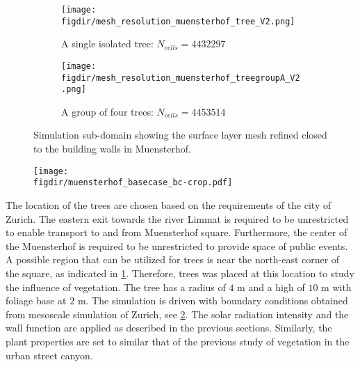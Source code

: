 \begin{figure}[p]
	\centering
	\begin{subfigure}[b]{0.8\linewidth}
		\texttt{[image: \\figdir/mesh\_resolution\_muensterhof\_tree\_V2.png]}
		\caption{A single isolated tree: $N_{\textit{cells}} = \num{4432297}$}%
	\end{subfigure}
	
	\medskip
	
	\begin{subfigure}[b]{0.8\linewidth}
		\texttt{[image: \\figdir/mesh\_resolution\_muensterhof\_treegroupA\_V2.png]}
		\caption{A group of four trees: $N_{\textit{cells}} = \num{4453514}$}%
	\end{subfigure}
	\caption{Simulation sub-domain showing the surface layer mesh refined closed to the building walls in Muensterhof.}
	\label{fig:mesh_resolution_muensterhof_tree}
\end{figure}

\begin{figure}[p]
	\centering
	\texttt{[image: \\figdir/muensterhof\_basecase\_bc-crop.pdf]}
	\caption{}
	\label{fig:muensterhof_bc}
\end{figure}


The location of the trees are chosen based on the requirements of the city of Zurich. The eastern exit towards the river Limmat is required to be unrestricted to enable transport to and from Muensterhof square. Furthermore, the center of the Muensterhof is required to be unrestricted to provide space of public events. A possible region that can be utilized for trees is near the north-east corner of the square, as indicated in \cref{fig:mesh_resolution_muensterhof_tree}. Therefore, trees was placed at this location to study the influence of vegetation. The tree has a radius of $4$ m and a high of $10$ m with foliage base at $2$ m. The simulation is driven with boundary conditions obtained from mesoscale simulation of Zurich, see \cref{fig:muensterhof_bc}. The solar radiation intensity and the wall function are applied as described in the previous sections. Similarly, the plant properties are set to similar that of the previous study of vegetation in the urban street canyon. 

